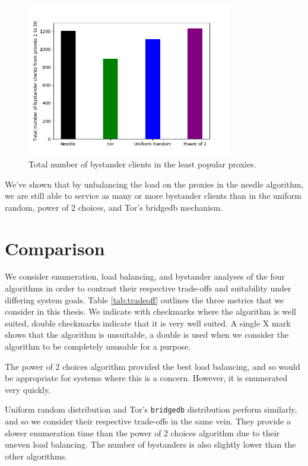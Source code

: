 \begin{figure}[h!]
\centering
     \includegraphics[width=0.8\textwidth]{fig/client_service_p_50_to_n_100_5000.png}
    \caption{Total number of bystander clients in the least popular proxies.}
    \label{fig:bscompare}
\end{figure}

We've shown that by unbalancing the load on the proxies in the needle algorithm, we are still able to service as many or more bystander clients than in the uniform random, power of 2 choices, and Tor's bridgedb mechanism.


\section{Comparison}

We consider enumeration, load balancing, and bystander analyses of the four algorithms in order to contrast their respective trade-offs and suitability under differing system goals. Table \ref{tab:tradeoff} outlines the three metrics that we consider in this thesis. We indicate with checkmarks  where the algorithm is well suited, double checkmarks indicate that it is very well suited. A single X mark  shows that the algorithm is unsuitable, a double   is used when we consider the algorithm to be completely unusable for a purpose.

The power of 2 choices algorithm provided the best load balancing, and so would be appropriate for systems where this is a concern. However, it is enumerated very quickly.

Uniform random distribution and Tor's \texttt{bridgedb} distribution perform similarly, and so we consider their respective trade-offs in the same vein. They provide a slower enumeration time than the power of 2 choices algorithm due to their uneven load balancing. The number of bystanders is also slightly lower than the other algorithms.

